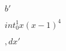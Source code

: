 \documentclass[preview]{standalone}
\begin{document}
\begin{align*}
b'\\\\int_{0}^{1} x(x-1)^4 \\\\,dx'
\end{align*}
\end{document}
